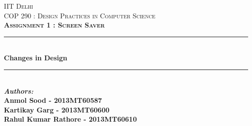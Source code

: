 \begin{titlepage}

\newcommand{\HRule}{\rule{\linewidth}{0.5mm}} %

\center %
 

\textsc{\LARGE IIT Delhi}\\[1.0cm] %
\textsc{\Large COP 290 : Design Practices in Computer Science}\\[0.5cm] %
\textsc{\large \textbf{Assignment 1 : Screen Saver}}\\[0.5cm] %


\HRule \\[0.4cm]
{ \huge \bfseries Changes in Design }\\[0.4cm] %
\HRule \\[1.5cm]
 

\emph{\textbf{Authors:}}\\
\textbf{Anmol Sood - 2013MT60587}  %
\\
\textbf{Kartikay Garg - 2013MT60600} %
\\
\textbf{Rahul Kumar Rathore - 2013MT60610}  %





\end{titlepage}
